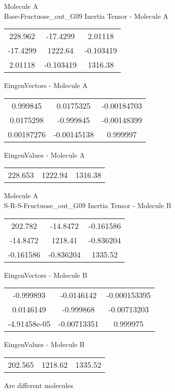 \newpage
\begin{multicols}{2}
\begin{center}
Molecule A \\ 
Base-Fructuose_out_G09
Inertia Tensor - Molecule A \\
\vtab
\begin{tabular}{|c c c|}
228.962	 & 	-17.4299	 & 	2.01118	 \\
-17.4299	 & 	1222.64	 & 	-0.103419	 \\
2.01118	 & 	-0.103419	 & 	1316.38
\end{tabular}

\vtab
 EingenVectors - Molecule A     \\
\vtab
\begin{tabular}{|c c c|}
0.999845	 & 	0.0175325	 & 	-0.00184703	 \\
0.0175298	 & 	-0.999845	 & 	-0.00148399	 \\
0.00187276	 & 	-0.00145138	 & 	0.999997
\end{tabular}

\vtab
 EingenValues - Molecule A     \\
\vtab
\begin{tabular}{|c c c|}
228.653	 & 	1222.94	 & 	1316.38
\end{tabular}
\columnbreak
Molecule A \\ 
S-R-S-Fructuose_out_G09
Inertia Tensor - Molecule B \\
\vtab
\begin{tabular}{|c c c|}
202.782	 & 	-14.8472	 & 	-0.161586	 \\
-14.8472	 & 	1218.41	 & 	-0.836204	 \\
-0.161586	 & 	-0.836204	 & 	1335.52
\end{tabular}

\vtab
 EingenVectors - Molecule B     \\
\vtab
\begin{tabular}{|c c c|}
-0.999893	 & 	-0.0146142	 & 	-0.000153395	 \\
0.0146149	 & 	-0.999868	 & 	-0.00713203	 \\
-4.91458e-05	 & 	-0.00713351	 & 	0.999975
\end{tabular}

\vtab
 EingenValues - Molecule B     \\
\vtab
\begin{tabular}{|c c c|}
202.565	 & 	1218.62	 & 	1335.52
\end{tabular}
\textcolor{NavyBlue}{\large Are different molecules}
\end{center}
\end{multicols}
